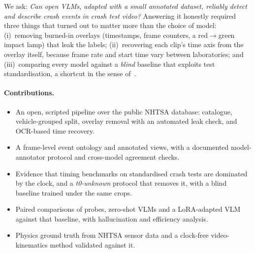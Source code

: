 \documentclass[10pt,twocolumn]{article}
\begin{document}
We ask: \emph{Can open VLMs, adapted with a small annotated dataset, reliably detect and
describe crash events in crash test video?} Answering it honestly required three things that
turned out to matter more than the choice of model:
(i)~removing burned-in overlays (timestamps, frame counters, a red$\to$green impact lamp) that
leak the labels;
(ii)~recovering each clip's time axis from the overlay itself, because frame rate and start
time vary between laboratories; and
(iii)~comparing every model against a \emph{blind} baseline that exploits test standardisation,
a shortcut in the sense of~\citet{geirhos2020shortcut}.

\paragraph{Contributions.}
\begin{itemize}\setlength\itemsep{0pt}
\item An open, scripted pipeline over the public NHTSA database: catalogue, vehicle-grouped
split, overlay removal with an automated leak check, and OCR-based time recovery.
\item A frame-level event ontology and \NLabelled{} annotated views, with a documented
model-annotator protocol and cross-model agreement checks.
\item Evidence that timing benchmarks on standardised crash tests are dominated by the clock,
and a \emph{t0-unknown} protocol that removes it, with a blind baseline trained under the same
crops.
\item Paired comparisons of probes, zero-shot VLMs and a LoRA-adapted VLM against that
baseline, with hallucination and efficiency analysis.
\item Physics ground truth from NHTSA sensor data and a clock-free video-kinematics method
validated against it.
\end{itemize}
\end{document}
